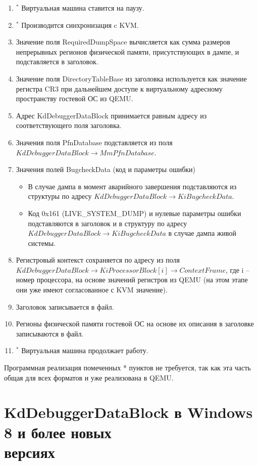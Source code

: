 \documentclass{mipt-thesis-bs}
\begin{document}
\begin{enumerate}
    \item $\!\!\!\!{^*}$ Виртуальная машина ставится на паузу.
    \item $\!\!\!\!{^*}$ Производится синхронизация c KVM.
    \item Значение поля RequiredDumpSpace вычисляется как сумма размеров непрерывных регионов физической памяти, присутствующих в дампе, и подставляется в заголовок.
    \item Значение поля DirectoryTableBase из заголовка используется как значение регистра CR3 при дальнейшем доступе к виртуальному адресному пространству гостевой ОС из QEMU.
    \item Адрес KdDebuggerDataBlock принимается равным адресу из соответствующего поля заголовка.
    \item Значения поля PfnDatabase подставляется из поля $KdDebuggerDataBlock \! \rightarrow \! MmPfnDatabase$.
    \item Значения полей BugcheckData (код и параметры ошибки)
    \begin{itemize}
        \item В случае дампа в момент аварийного завершения подставляются из структуры по адресу $KdDebuggerDataBlock \! \rightarrow \! KiBugcheckData$.
        \item Код 0x161 (LIVE{\_}SYSTEM{\_DUMP}) и нулевые параметры ошибки подставляются в заголовок и в структуру по адресу $KdDebuggerDataBlock \! \rightarrow \! KiBugcheckData$ в случае дампа живой системы.
    \end{itemize}
    \item Регистровый контекст сохраняется по адресу из поля $KdDebuggerDataBlock \! \rightarrow \! KiProcessorBlock[i] \! \rightarrow \! ContextFrame$, где i -- номер процессора, на основе значений регистров из QEMU (на этом этапе они уже имеют согласованное с KVM значение).
    \item Заголовок записывается в файл.
    \item Регионы физической памяти гостевой ОС на основе их описания в заголовке записываются в файл.
    \item $\!\!\!\!{^*}$ Виртуальная машина продолжает работу.
\end{enumerate}

Программная реализация помеченных {*} пунктов не требуется, так как эта часть общая для всех форматов и уже реализована в QEMU.

\section*{KdDebuggerDataBlock в Windows 8 и более новых\\версиях}
\end{document}
